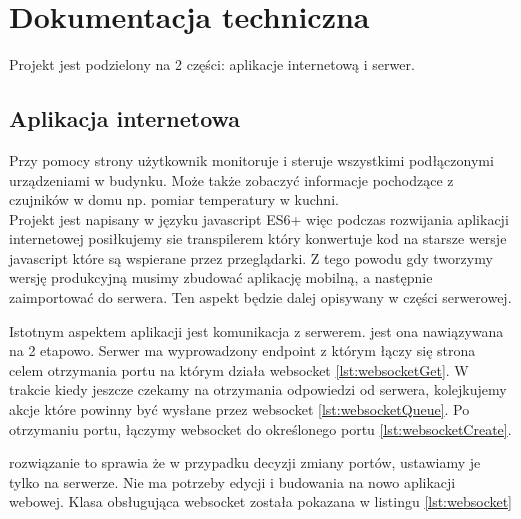 \chapter{Dokumentacja techniczna}%
Projekt jest podzielony na 2 części: aplikacje internetową i serwer.
\section{Aplikacja internetowa}
Przy pomocy strony użytkownik monitoruje i steruje wszystkimi podłączonymi urządzeniami w budynku. Może także zobaczyć informacje pochodzące z czujników w domu np. pomiar temperatury w kuchni. \\
Projekt jest napisany w języku javascript ES6+ więc podczas rozwijania aplikacji internetowej posiłkujemy sie transpilerem który konwertuje kod na starsze wersje javascript które są wspierane przez przeglądarki. Z tego powodu gdy tworzymy wersję produkcyjną musimy zbudować aplikację mobilną, a następnie zaimportować do serwera. Ten aspekt będzie dalej opisywany w części serwerowej.
\par Istotnym aspektem aplikacji jest komunikacja z serwerem. jest ona nawiązywana na 2 etapowo.
Serwer ma wyprowadzony endpoint z którym łączy się strona celem otrzymania portu na którym działa websocket \ref{lst:websocketGet}. W trakcie kiedy jeszcze czekamy na otrzymania odpowiedzi od serwera, kolejkujemy akcje które powinny być wysłane przez websocket \ref{lst:websocketQueue}. Po otrzymaniu portu, łączymy websocket do określonego portu \ref{lst:websocketCreate}. 
\par rozwiązanie to sprawia że w przypadku decyzji zmiany portów, ustawiamy je tylko na serwerze. Nie ma potrzeby edycji i budowania na nowo aplikacji webowej. Klasa obsługująca websocket została pokazana w listingu \ref{lst:websocket}
\newpage

